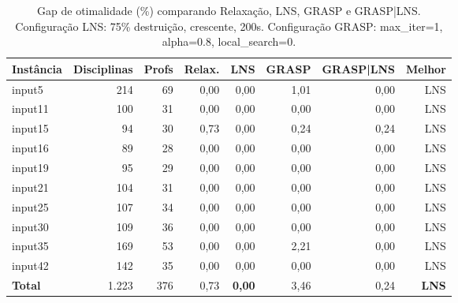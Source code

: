 \begin{table}[htbp]
\centering
\caption{Gap de otimalidade (\%) comparando Relaxação, LNS, GRASP e GRASP|LNS. Configuração LNS: 75\% destruição, crescente, 200s. Configuração GRASP: max\_iter=1, alpha=0.8, local\_search=0.}
\label{tab:geral_gap}
\small
\begin{tabular}{@{}lrrrrrrr@{}}
\toprule
\textbf{Instância} & \textbf{Disciplinas} & \textbf{Profs} & \textbf{Relax.} & \textbf{LNS} & \textbf{GRASP} & \textbf{GRASP|LNS} & \textbf{Melhor} \\
\midrule
input5  & 214 & 69 & 0,00 & 0,00 & 1,01 & 0,00 & LNS \\
input11 & 100 & 31 & 0,00 & 0,00 & 0,00 & 0,00 & LNS \\
input15 & 94  & 30 & 0,73 & 0,00 & 0,24 & 0,24 & LNS \\
input16 & 89  & 28 & 0,00 & 0,00 & 0,00 & 0,00 & LNS \\
input19 & 95  & 29 & 0,00 & 0,00 & 0,00 & 0,00 & LNS \\
input21 & 104 & 31 & 0,00 & 0,00 & 0,00 & 0,00 & LNS \\
input25 & 107 & 34 & 0,00 & 0,00 & 0,00 & 0,00 & LNS \\
input30 & 109 & 36 & 0,00 & 0,00 & 0,00 & 0,00 & LNS \\
input35 & 169 & 53 & 0,00 & 0,00 & 2,21 & 0,00 & LNS \\
input42 & 142 & 35 & 0,00 & 0,00 & 0,00 & 0,00 & LNS \\
\midrule
\textbf{Total} & 1.223 & 376 & 0,73 & \textbf{0,00} & 3,46 & 0,24 & \textbf{LNS} \\
\bottomrule
\end{tabular}
\end{table}
